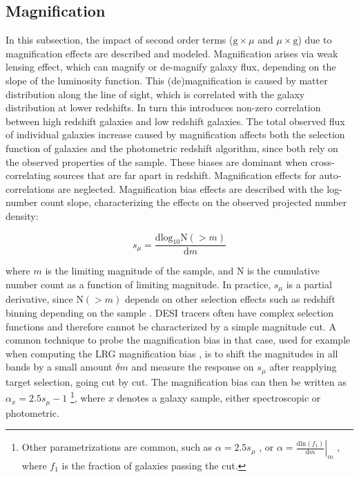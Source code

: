 \subsection{Magnification}\label{sec:modeling:magnification}

In this subsection, the impact of second order terms ($\mathrm{g}\times\mu$ and $\mu\times \mathrm{g}$) due to magnification effects are described and modeled. Magnification arises via weak lensing effect, which can magnify or de-magnify galaxy flux, depending on the slope of the luminosity function. This (de)magnification is caused by matter distribution along the line of sight, which is correlated with the galaxy distribution at lower redshifts. In turn this introduces non-zero correlation between high redshift galaxies and low redshift galaxies. The total observed flux of individual galaxies increase caused by magnification affects both the selection function of galaxies \cite{ElvinPoole2023MagnificationModelling} and the photometric redshift algorithm, since both rely on the observed properties of the sample. These biases are dominant when cross-correlating sources that are far apart in redshift. Magnification effects for auto-correlations are neglected. Magnification bias effects are described with the log-number count slope, characterizing the effects on the observed projected number density:

\begin{equation}
    s_\mu=\frac{\mathrm{dlog_{10}}\mathrm{N}(>m)}{\mathrm{d}m}
\end{equation}

where $m$ is the limiting magnitude of the sample, and $\mathrm{N}$ is the cumulative number count as a function of limiting magnitude. In practice, $s_\mu$ is a partial derivative, since $\mathrm{N}(>m)$ depends on other selection effects such as redshift binning depending on the sample \cite{Nicola2020TomoclusteringHSCY1}. DESI tracers often have complex selection functions \cite{DESI.Selection.BGS.Hahn2023, DESI.Selection.LRG.Zhou2023, DESI.Selection.ELG.Raichoor2023, DESI.Selection.QSO.Chaussidon2023} and therefore cannot be characterized by a simple magnitude cut. A common technique to probe the magnification bias in that case, used for example when computing the LRG magnification bias \cite{DESI.LRGCross.Magnifcation.Zhou2023}, is to shift the magnitudes in all bands by a small amount $\delta m$ and measure the response on $s_\mu$ after reapplying target selection, going cut by cut. The magnification bias can then be written as  $\alpha_x=2.5s_\mu-1$\cite{Gatti2021ClusteringDESWLsrcDistrib, Gatti2018DESY1ClusteringRedshifts} \footnote{Other parametrizations are common, such as $\alpha=2.5s_\mu$ \cite{DESI.LRGCross.Magnifcation.Zhou2023, MagnificationBiasComplexSelections, ChoiCFHTLensAngularCross2016}, or $\left.\alpha=\frac{\mathrm{dln}(f_1)}{\mathrm{d}m}\right|_m$ \cite{heydenreich2025lensingbordersmeasurementsgalaxygalaxy}, where $f_1$ is the fraction of galaxies passing the cut.}, where $x$ denotes a galaxy sample, either spectroscopic or photometric. 

